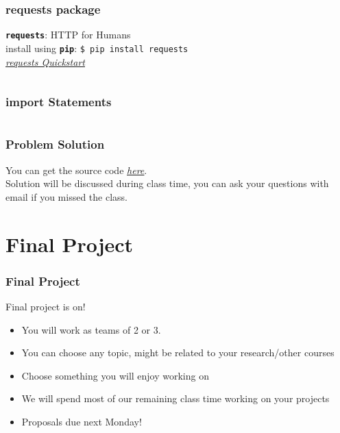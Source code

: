     \begin{frame}
        \frametitle{requests package}
        \LARGE
        \texttt{\textbf{requests}}: HTTP for Humans\\
        \pause
        install using \texttt{\textbf{pip}}: \texttt{\$ pip install requests}\\
        \pause
        \href{https://2.python-requests.org/en/master/user/quickstart/}{\underline{\textit{requests Quickstart}}}
        \pause
        \inputminted[frame=single,framesep=2pt]{python3}{code-examples/req.py}
    \end{frame}

    \begin{frame}
        \frametitle{import Statements}
        \Large
        \inputminted[frame=single,framesep=2pt]{python3}{code-examples/import_statements.py}

    \end{frame}

    \begin{frame}
        \frametitle{Problem Solution}
        \huge
        You can get the source code \href{https://github.com/koltpython/python-slides/tree/master/Lecture8/code-examples/}{\underline{\textit{here}}}.\\
        \pause
        Solution will be discussed during class time, you can ask your questions with email if you missed the class.
    \end{frame}

    \section{Final Project}
    \begin{frame}
        \frametitle{Final Project}
        \LARGE
        \pause
        Final project is on!
        \pause
        \begin{itemize}
            \item You will work as teams of 2 or 3.
            \pause
            \item You can choose any topic, might be related to your research/other courses
            \pause
            \item Choose something you will enjoy working on
            \pause
            \item We will spend most of our remaining class time working on your projects
            \pause
            \item Proposals due next Monday!
        \end{itemize}
    
    \end{frame}

